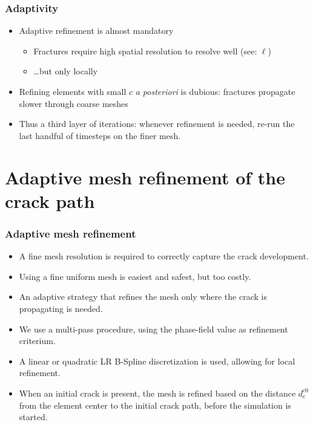 \documentclass{beamer}
\begin{document}
\begin{frame}
  \frametitle{Adaptivity}

  \begin{itemize}
  \item Adaptive refinement is almost mandatory
    \begin{itemize}
    \item Fractures require high spatial resolution to resolve well (see: $\ell$)
    \item \ldots but only locally
    \end{itemize}
  \item<2-> Refining elements with small $c$ \alert{\emph{a posteriori}} is
    dubious: fractures propagate slower through coarse meshes
  \item<3-> Thus a third layer of iterations: whenever refinement is
    needed, re-run the last handful of timesteps on the finer mesh.
  \end{itemize}
\end{frame}

\section{Adaptive mesh refinement of the crack path}

\begin{frame}
  \frametitle{Adaptive mesh refinement}

  \begin{itemize}
  \item A fine mesh resolution is required to correctly capture the crack development.
  \item Using a fine uniform mesh is easiest and safest, but too costly.
  \item An adaptive strategy that refines the mesh only where the crack is propagating is needed.
  \item We use a multi-pass procedure, using the phase-field value as refinement criterium.
  \item A linear or quadratic LR B-Spline discretization is used,
    allowing for local refinement.
  \item When an initial crack is present, the mesh is refined based on the
    distance $d^{c0}_e$ from the element center to the initial crack path,
    before the simulation is started.
  \end{itemize}
\end{frame}
\end{document}
